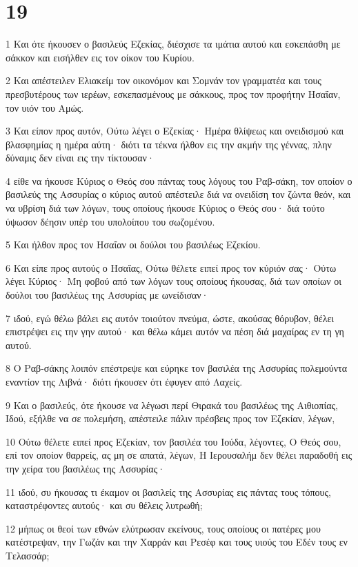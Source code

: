 \chapter{19}

\par 1 Και ότε ήκουσεν ο βασιλεύς Εζεκίας, διέσχισε τα ιμάτια αυτού και εσκεπάσθη με σάκκον και εισήλθεν εις τον οίκον του Κυρίου.
\par 2 Και απέστειλεν Ελιακείμ τον οικονόμον και Σομνάν τον γραμματέα και τους πρεσβυτέρους των ιερέων, εσκεπασμένους με σάκκους, προς τον προφήτην Ησαΐαν, τον υιόν του Αμώς.
\par 3 Και είπον προς αυτόν, Ούτω λέγει ο Εζεκίας· Ημέρα θλίψεως και ονειδισμού και βλασφημίας η ημέρα αύτη· διότι τα τέκνα ήλθον εις την ακμήν της γέννας, πλην δύναμις δεν είναι εις την τίκτουσαν·
\par 4 είθε να ήκουσε Κύριος ο Θεός σου πάντας τους λόγους του Ραβ-σάκη, τον οποίον ο βασιλεύς της Ασσυρίας ο κύριος αυτού απέστειλε διά να ονειδίση τον ζώντα θεόν, και να υβρίση διά των λόγων, τους οποίους ήκουσε Κύριος ο Θεός σου· διά τούτο ύψωσον δέησιν υπέρ του υπολοίπου του σωζομένου.
\par 5 Και ήλθον προς τον Ησαΐαν οι δούλοι του βασιλέως Εζεκίου.
\par 6 Και είπε προς αυτούς ο Ησαΐας, Ούτω θέλετε ειπεί προς τον κύριόν σας· Ούτω λέγει Κύριος· Μη φοβού από των λόγων τους οποίους ήκουσας, διά των οποίων οι δούλοι του βασιλέως της Ασσυρίας με ωνείδισαν·
\par 7 ιδού, εγώ θέλω βάλει εις αυτόν τοιούτον πνεύμα, ώστε, ακούσας θόρυβον, θέλει επιστρέψει εις την γην αυτού· και θέλω κάμει αυτόν να πέση διά μαχαίρας εν τη γη αυτού.
\par 8 Ο Ραβ-σάκης λοιπόν επέστρεψε και εύρηκε τον βασιλέα της Ασσυρίας πολεμούντα εναντίον της Λιβνά· διότι ήκουσεν ότι έφυγεν από Λαχείς.
\par 9 Και ο βασιλεύς, ότε ήκουσε να λέγωσι περί Θιρακά του βασιλέως της Αιθιοπίας, Ιδού, εξήλθε να σε πολεμήση, απέστειλε πάλιν πρέσβεις προς τον Εζεκίαν, λέγων,
\par 10 Ούτω θέλετε ειπεί προς Εζεκίαν, τον βασιλέα του Ιούδα, λέγοντες, Ο Θεός σου, επί τον οποίον θαρρείς, ας μη σε απατά, λέγων, Η Ιερουσαλήμ δεν θέλει παραδοθή εις την χείρα του βασιλέως της Ασσυρίας·
\par 11 ιδού, συ ήκουσας τι έκαμον οι βασιλείς της Ασσυρίας εις πάντας τους τόπους, καταστρέφοντες αυτούς· και συ θέλεις λυτρωθή;
\par 12 μήπως οι θεοί των εθνών ελύτρωσαν εκείνους, τους οποίους οι πατέρες μου κατέστρεψαν, την Γωζάν και την Χαρράν και Ρεσέφ και τους υιούς του Εδέν τους εν Τελασσάρ;
